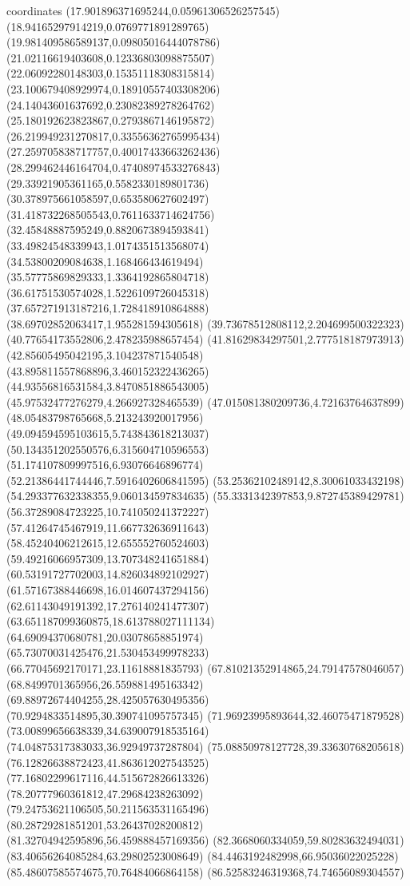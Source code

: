 coordinates {%
(17.901896371695244,0.05961306526257545)
(18.94165297914219,0.0769771891289765)
(19.981409586589137,0.09805016444078786)
(21.02116619403608,0.12336803098875507)
(22.06092280148303,0.15351118308315814)
(23.100679408929974,0.18910557403308206)
(24.14043601637692,0.23082389278264762)
(25.180192623823867,0.2793867146195872)
(26.219949231270817,0.33556362765995434)
(27.259705838717757,0.40017433663262436)
(28.299462446164704,0.47408974533276843)
(29.33921905361165,0.5582330189801736)
(30.378975661058597,0.653580627602497)
(31.418732268505543,0.7611633714624756)
(32.45848887595249,0.8820673894593841)
(33.49824548339943,1.0174351513568074)
(34.53800209084638,1.168466434619494)
(35.57775869829333,1.3364192865804718)
(36.61751530574028,1.5226109726045318)
(37.657271913187216,1.728418910864888)
(38.69702852063417,1.955281594305618)
(39.73678512808112,2.204699500322323)
(40.77654173552806,2.478235988657454)
(41.81629834297501,2.777518187973913)
(42.85605495042195,3.104237871540548)
(43.895811557868896,3.460152322436265)
(44.93556816531584,3.8470851886543005)
(45.97532477276279,4.266927328465539)
(47.015081380209736,4.72163764637899)
(48.05483798765668,5.213243920017956)
(49.094594595103615,5.743843618213037)
(50.134351202550576,6.315604710596553)
(51.174107809997516,6.93076646896774)
(52.21386441744446,7.5916402606841595)
(53.25362102489142,8.30061033432198)
(54.293377632338355,9.060134597834635)
(55.3331342397853,9.872745389429781)
(56.37289084723225,10.741050241372227)
(57.41264745467919,11.667732636911643)
(58.45240406212615,12.655552760524603)
(59.49216066957309,13.707348241651884)
(60.53191727702003,14.826034892102927)
(61.57167388446698,16.014607437294156)
(62.61143049191392,17.276140241477307)
(63.651187099360875,18.613788027111134)
(64.69094370680781,20.03078658851974)
(65.73070031425476,21.530453499978233)
(66.77045692170171,23.11618881835793)
(67.81021352914865,24.79147578046057)
(68.8499701365956,26.559881495163342)
(69.88972674404255,28.425057630495356)
(70.9294833514895,30.390741095757345)
(71.96923995893644,32.46075471879528)
(73.00899656638339,34.639007918535164)
(74.04875317383033,36.92949737287804)
(75.08850978127728,39.33630768205618)
(76.12826638872423,41.863612027543525)
(77.16802299617116,44.515672826613326)
(78.20777960361812,47.29684238263092)
(79.24753621106505,50.211563531165496)
(80.28729281851201,53.26437028200812)
(81.32704942595896,56.459888457169356)
(82.3668060334059,59.80283632494031)
(83.40656264085284,63.29802523008649)
(84.4463192482998,66.95036022025228)
(85.48607585574675,70.76484066864158)
(86.52583246319368,74.74656089304557)
}
